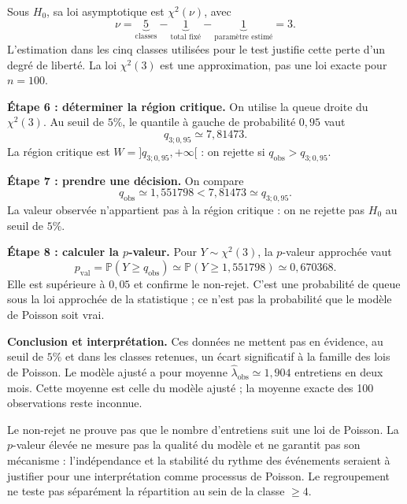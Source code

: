 {{\begin{minipage}{\linewidth}
Sous $H_0$, sa loi asymptotique est $\chi^2(\nu)$, avec
\[
\nu=\underbrace{5}_{\text{classes}}-
\underbrace{1}_{\text{total fixé}}-
\underbrace{1}_{\text{paramètre estimé}}=3.
\]
L'estimation dans les cinq classes utilisées pour le test justifie cette perte d'un degré de liberté. La loi $\chi^2(3)$ est une approximation, pas une loi exacte pour $n=100$.
\end{minipage}\par\smallskip

\begin{minipage}{\linewidth}
\textbf{Étape 6 : déterminer la région critique.} On utilise la queue droite du $\chi^2(3)$. Au seuil de $5\%$, le quantile à gauche de probabilité $0{,}95$ vaut
\[
q_{3;0{,}95}\simeq7{,}81473.
\]
La région critique est $W=]q_{3;0{,}95},+\infty[$ : on rejette si $q_{\mathrm{obs}}>q_{3;0{,}95}$.
\end{minipage}\par\smallskip

\begin{minipage}{\linewidth}
\textbf{Étape 7 : prendre une décision.} On compare
\[
q_{\mathrm{obs}}\simeq1{,}551798<7{,}81473\simeq q_{3;0{,}95}.
\]
La valeur observée n'appartient pas à la région critique : on ne rejette pas $H_0$ au seuil de $5\%$.
\end{minipage}\par\smallskip

\begin{minipage}{\linewidth}
\textbf{Étape 8 : calculer la $p$-valeur.} Pour $Y\sim\chi^2(3)$, la $p$-valeur approchée vaut
\[
p_{\mathrm{val}}=\mathbb P(Y\geq q_{\mathrm{obs}})
\simeq\mathbb P(Y\geq1{,}551798)\simeq0{,}670368.
\]
Elle est supérieure à $0{,}05$ et confirme le non-rejet. C'est une probabilité de queue sous la loi approchée de la statistique ; ce n'est pas la probabilité que le modèle de Poisson soit vrai.
\end{minipage}\par\smallskip

\begin{minipage}{\linewidth}
\textbf{Conclusion et interprétation.} Ces données ne mettent pas en évidence, au seuil de $5\%$ et dans les classes retenues, un écart significatif à la famille des lois de Poisson. Le modèle ajusté a pour moyenne $\widehat\lambda_{\mathrm{obs}}\simeq1{,}904$ entretiens en deux mois. Cette moyenne est celle du modèle ajusté ; la moyenne exacte des 100 observations reste inconnue.

Le non-rejet ne prouve pas que le nombre d'entretiens suit une loi de Poisson. La $p$-valeur élevée ne mesure pas la qualité du modèle et ne garantit pas son mécanisme : l'indépendance et la stabilité du rythme des événements seraient à justifier pour une interprétation comme processus de Poisson. Le regroupement ne teste pas séparément la répartition au sein de la classe $\geq4$.
\end{minipage}\par\smallskip

}}
